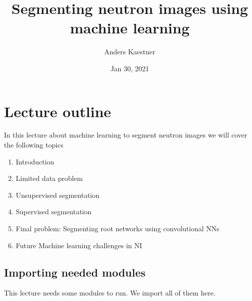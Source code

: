 \documentclass[letterpaper,10pt,english]{sphinxmanual}
\title{Segmenting neutron images using machine learning}
\date{Jan 30, 2021}
\author{Anders Kaestner}
\begin{document}
\pagestyle{empty}
\sphinxmaketitle
\pagestyle{plain}
\sphinxtableofcontents
\pagestyle{normal}
\label{\detokenize{ML4NeutronImageSegmentation::doc}}





\chapter{Lecture outline}
\label{\detokenize{ML4NeutronImageSegmentation:lecture-outline}}
In this lecture about machine learning to segment neutron images we will cover the following topics
\begin{enumerate}
%
\item {} 
Introduction

\item {} 
Limited data problem

\item {} 
Unsupervised segmentation

\item {} 
Supervised segmentation

\item {} 
Final problem: Segmenting root networks using convolutional NNs

\item {} 
Future Machine learning challenges in NI

\end{enumerate}


\section{Importing needed modules}
\label{\detokenize{ML4NeutronImageSegmentation:importing-needed-modules}}
This lecture needs some modules to run. We import all of them here.
\end{document}
